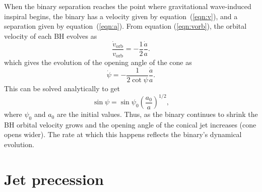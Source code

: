 \documentclass[a4paper,fleqn,usenatbib]{mnras}
\begin{document}
When the binary separation reaches the point where gravitational
wave-induced inspiral begins, the binary has a velocity given by
equation~(\ref{eqn:v}), and a separation given by
equation~(\ref{eqn:a}).  From equation (\ref{eqn:vorb}), the orbital
velocity of each BH evolves as
\begin{equation}
  \frac{\dot v_\mathrm{orb}}{v_\mathrm{orb}} = -\frac{1}{2}\frac{\dot a}{a}.
\end{equation}
which gives the evolution of the opening angle of the cone as 
\begin{equation}
  \dot\psi = -\frac{1}{2\cot\psi}\frac{\dot a}{a}.
  \label{eqn:widen}
\end{equation}
This can be solved analytically to get
\begin{equation}
  \sin\psi = \sin\psi_0\left(\frac{a_0}{a}\right)^{1/2},
\end{equation}
where $\psi_0$ and $a_0$ are the initial values. Thus, as the binary
continues to shrink the BH orbital velocity grows and the opening
angle of the conical jet increases (cone opens wider).  The rate at
which this happens reflects the binary's dynamical evolution.

\section{Jet precession}
\end{document}
